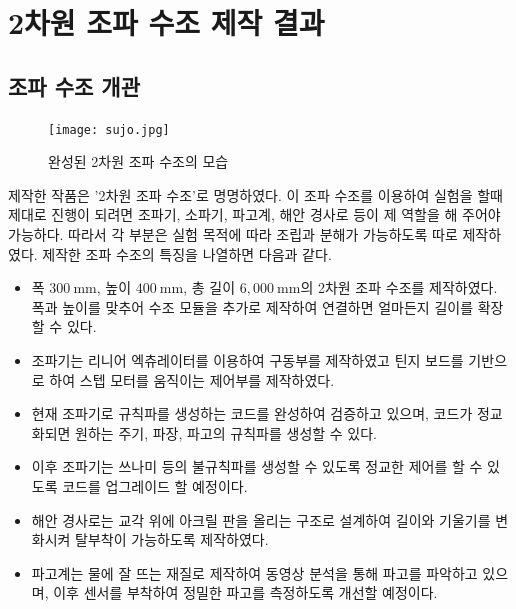 \section{2차원 조파 수조 제작 결과}

\subsection{조파 수조 개관}

\begin{figure}[htbp]
	\begin{center}
		\texttt{[image: sujo.jpg]}
		\caption{완성된 2차원 조파 수조의 모습}
		\label{Wavetank}
	\end{center}
\end{figure}
 
제작한 작품은 '2차원 조파 수조'로 명명하였다. 이 조파 수조를 이용하여 실험을 할때 제대로 진행이 되려면 조파기, 소파기, 파고계, 해안 경사로 등이 제 역할을 해 주어야 가능하다. 따라서 각 부분은 실험 목적에 따라 조립과 분해가 가능하도록 따로 제작하였다. 제작한 조파 수조의 특징을 나열하면 다음과 같다.

\begin{itemize}
    \item 폭 $300~\mathrm{mm}$, 높이 $400~\mathrm{mm}$, 총 길이 $6,000~\mathrm{mm}$의 2차원 조파 수조를 제작하였다. 폭과 높이를 맞추어 수조 모듈을 추가로 제작하여 연결하면 얼마든지 길이를 확장할 수 있다. 
    \item 조파기는 리니어 엑츄레이터를 이용하여 구동부를 제작하였고 틴지 보드를 기반으로 하여 스텝 모터를 움직이는 제어부를 제작하였다. 
    \item 현재 조파기로 규칙파를 생성하는 코드를 완성하여 검증하고 있으며, 코드가 정교화되면 원하는 주기, 파장, 파고의 규칙파를 생성할 수 있다. 
    \item 이후 조파기는 쓰나미 등의 불규칙파를 생성할 수 있도록 정교한 제어를 할 수 있도록 코드를 업그레이드 할 예정이다. 
    \item 해안 경사로는 교각 위에 아크릴 판을 올리는 구조로 설계하여 길이와 기울기를 변화시켜 탈부착이 가능하도록 제작하였다. 
    \item 파고계는 물에 잘 뜨는 재질로 제작하여 동영상 분석을 통해 파고를 파악하고 있으며, 이후 센서를 부착하여 정밀한 파고를 측정하도록 개선할 예정이다.
\end{itemize}

